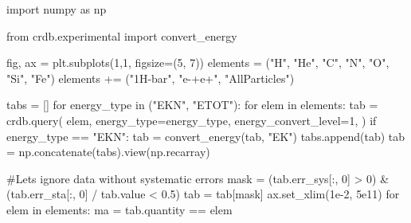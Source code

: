 \documentclass[
  letterpaper,
  DIV=11,
  numbers=noendperiod]{scrreprt}
\newenvironment{Shaded}{\begin{snugshade}}{\end{snugshade}}
\newcommand{\CommentTok}[1]{\textcolor[rgb]{0.37,0.37,0.37}{#1}}
\newcommand{\ControlFlowTok}[1]{\textcolor[rgb]{0.00,0.23,0.31}{#1}}
\newcommand{\DecValTok}[1]{\textcolor[rgb]{0.68,0.00,0.00}{#1}}
\newcommand{\FloatTok}[1]{\textcolor[rgb]{0.68,0.00,0.00}{#1}}
\newcommand{\ImportTok}[1]{\textcolor[rgb]{0.00,0.46,0.62}{#1}}
\newcommand{\KeywordTok}[1]{\textcolor[rgb]{0.00,0.23,0.31}{#1}}
\newcommand{\NormalTok}[1]{\textcolor[rgb]{0.00,0.23,0.31}{#1}}
\newcommand{\OperatorTok}[1]{\textcolor[rgb]{0.37,0.37,0.37}{#1}}
\newcommand{\StringTok}[1]{\textcolor[rgb]{0.13,0.47,0.30}{#1}}
\begin{document}
\begin{Shaded}
\begin{Highlighting}[]
\ImportTok{import}\NormalTok{ numpy }\ImportTok{as}\NormalTok{ np}

\ImportTok{from}\NormalTok{ crdb.experimental }\ImportTok{import}\NormalTok{ convert\_energy}

\NormalTok{fig, ax }\OperatorTok{=}\NormalTok{ plt.subplots(}\DecValTok{1}\NormalTok{,}\DecValTok{1}\NormalTok{, figsize}\OperatorTok{=}\NormalTok{(}\DecValTok{5}\NormalTok{, }\DecValTok{7}\NormalTok{))}
\NormalTok{elements }\OperatorTok{=}\NormalTok{ (}\StringTok{"H"}\NormalTok{, }\StringTok{"He"}\NormalTok{, }\StringTok{"C"}\NormalTok{, }\StringTok{"N"}\NormalTok{, }\StringTok{"O"}\NormalTok{, }\StringTok{"Si"}\NormalTok{, }\StringTok{"Fe"}\NormalTok{)}
\NormalTok{elements }\OperatorTok{+=}\NormalTok{ (}\StringTok{"1H{-}bar"}\NormalTok{, }\StringTok{"e{-}+e+"}\NormalTok{, }\StringTok{"AllParticles"}\NormalTok{)}

\NormalTok{tabs }\OperatorTok{=}\NormalTok{ []}
\ControlFlowTok{for}\NormalTok{ energy\_type }\KeywordTok{in}\NormalTok{ (}\StringTok{"EKN"}\NormalTok{, }\StringTok{"ETOT"}\NormalTok{):}
    \ControlFlowTok{for}\NormalTok{ elem }\KeywordTok{in}\NormalTok{ elements:}
\NormalTok{        tab }\OperatorTok{=}\NormalTok{ crdb.query(}
\NormalTok{            elem,}
\NormalTok{            energy\_type}\OperatorTok{=}\NormalTok{energy\_type,}
\NormalTok{            energy\_convert\_level}\OperatorTok{=}\DecValTok{1}\NormalTok{,}
\NormalTok{        )}
        \ControlFlowTok{if}\NormalTok{ energy\_type }\OperatorTok{==} \StringTok{"EKN"}\NormalTok{:}
\NormalTok{            tab }\OperatorTok{=}\NormalTok{ convert\_energy(tab, }\StringTok{"EK"}\NormalTok{)}
\NormalTok{        tabs.append(tab)}
\NormalTok{tab }\OperatorTok{=}\NormalTok{ np.concatenate(tabs).view(np.recarray)}

\CommentTok{\#Lets ignore data without systematic errors}
\NormalTok{mask }\OperatorTok{=}\NormalTok{ (tab.err\_sys[:, }\DecValTok{0}\NormalTok{] }\OperatorTok{\textgreater{}} \DecValTok{0}\NormalTok{) }\OperatorTok{\&}\NormalTok{ (tab.err\_sta[:, }\DecValTok{0}\NormalTok{] }\OperatorTok{/}\NormalTok{ tab.value }\OperatorTok{\textless{}} \FloatTok{0.5}\NormalTok{)}
\NormalTok{tab }\OperatorTok{=}\NormalTok{ tab[mask]}
\NormalTok{ax.set\_xlim(}\FloatTok{1e{-}2}\NormalTok{, }\FloatTok{5e11}\NormalTok{)}
\ControlFlowTok{for}\NormalTok{ elem }\KeywordTok{in}\NormalTok{ elements:}
\NormalTok{    ma }\OperatorTok{=}\NormalTok{ tab.quantity }\OperatorTok{==}\NormalTok{ elem}


\end{Highlighting}
\end{Shaded}
\end{document}

